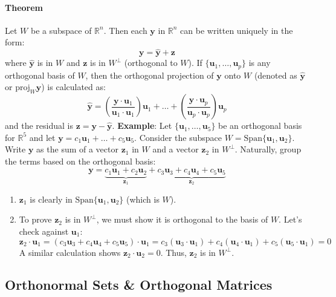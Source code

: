 \documentclass[../linear-algebra.tex]{subfiles}
\begin{document}
\paragraph{Theorem} Let $W$ be a subspace of $\mathbb{R}^n$. Then each $\mathbf{y}$ in $\mathbb{R}^n$ can be written uniquely in the form:
$$\mathbf{y} = \hat{\mathbf{y}} + \mathbf{z}$$
where $\hat{\mathbf{y}}$ is in $W$ and $\mathbf{z}$ is in $W^\perp$ (orthogonal to $W$).\newline
If $\{\mathbf{u}_1, \dots, \mathbf{u}_p\}$ is any orthogonal basis of $W$, then the orthogonal projection of $\mathbf{y}$ onto $W$ (denoted as $\hat{\mathbf{y}}$ or $\text{proj}_W \mathbf{y}$) is calculated as:
$$\hat{\mathbf{y}} = \left(\frac{\mathbf{y} \cdot \mathbf{u}_1}{\mathbf{u}_1 \cdot \mathbf{u}_1}\right)\mathbf{u}_1 + \dots + \left(\frac{\mathbf{y} \cdot \mathbf{u}_p}{\mathbf{u}_p \cdot \mathbf{u}_p}\right)\mathbf{u}_p$$
and the residual is $\mathbf{z} = \mathbf{y} - \hat{\mathbf{y}}$.\newline
\textbf{Example}: Let $\{\mathbf{u}_1, \dots, \mathbf{u}_5\}$ be an orthogonal basis for $\mathbb{R}^5$ and let $\mathbf{y} = c_1\mathbf{u}_1 + \dots + c_5\mathbf{u}_5$.
Consider the subspace $W = \text{Span}\{\mathbf{u}_1, \mathbf{u}_2\}$. Write $\mathbf{y}$ as the sum of a vector $\mathbf{z}_1$ in $W$ and a vector $\mathbf{z}_2$ in $W^\perp$.\newline
Naturally, group the terms based on the orthogonal basis:
$$\mathbf{y} = \underbrace{c_1\mathbf{u}_1 + c_2\mathbf{u}_2}_{\mathbf{z}_1} + \underbrace{c_3\mathbf{u}_3 + c_4\mathbf{u}_4 + c_5\mathbf{u}_5}_{\mathbf{z}_2}$$
\begin{enumerate}
    \item $\mathbf{z}_1$ is clearly in $\text{Span}\{\mathbf{u}_1, \mathbf{u}_2\}$ (which is $W$).
    \item To prove $\mathbf{z}_2$ is in $W^\perp$, we must show it is orthogonal to the basis of $W$. Let's check against $\mathbf{u}_1$:
    $$\mathbf{z}_2 \cdot \mathbf{u}_1 = (c_3\mathbf{u}_3 + c_4\mathbf{u}_4 + c_5\mathbf{u}_5) \cdot \mathbf{u}_1 = c_3(\mathbf{u}_3 \cdot \mathbf{u}_1) + c_4(\mathbf{u}_4 \cdot \mathbf{u}_1) + c_5(\mathbf{u}_5 \cdot \mathbf{u}_1) = 0$$
    A similar calculation shows $\mathbf{z}_2 \cdot \mathbf{u}_2 = 0$. Thus, $\mathbf{z}_2$ is in $W^\perp$.
\end{enumerate}

\subsection{Orthonormal Sets \& Orthogonal Matrices}
\end{document}
